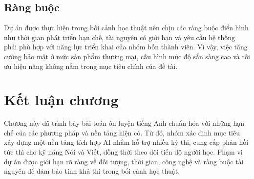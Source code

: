 \subsection{Ràng buộc}

Dự án được thực hiện trong bối cảnh học thuật nên chịu các ràng buộc điển hình như thời gian phát triển hạn chế, tài nguyên có giới hạn và yêu cầu hệ thống phải phù hợp với năng lực triển khai của nhóm bốn thành viên. Vì vậy, việc tăng cường bảo mật ở mức sản phẩm thương mại, cấu hình mức độ sẵn sàng cao và tối ưu hiệu năng không nằm trong mục tiêu chính của đề tài.


\section{Kết luận chương}
Chương này đã trình bày bài toán ôn luyện tiếng Anh chuẩn hóa với những hạn chế của các phương pháp và nền tảng hiện có. Từ đó, nhóm xác định mục tiêu xây dựng một nền tảng tích hợp AI nhằm hỗ trợ nhiều kỳ thi, cung cấp phản hồi tức thì cho kỹ năng Nói và Viết, đồng thời theo dõi tiến độ người học. Phạm vi dự án được giới hạn rõ ràng về đối tượng, thời gian, công nghệ và ràng buộc tài nguyên để đảm bảo tính khả thi trong bối cảnh học thuật.


